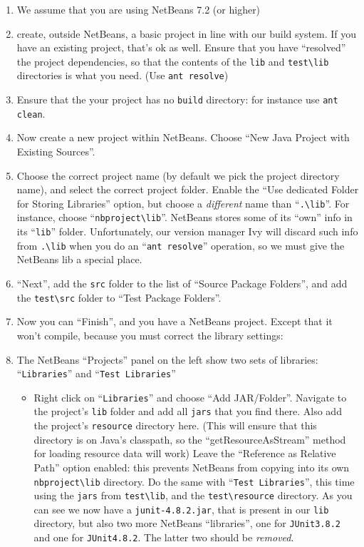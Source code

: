 \begin{enumerate}
\item We assume that you are using NetBeans 7.2 (or higher)
\item create, outside NetBeans, a basic project in line with our build system.
If you have an existing project, that's ok as well.
Ensure that you have ``resolved'' the project dependencies, so that the contents of
the \verb#lib# and \verb#test\lib# directories is what you need.
(Use \verb#ant resolve#)
\item Ensure that the your project has no \verb#build# directory: for instance use \verb#ant clean#.
\item Now create a new project within NetBeans. Choose ``New Java Project with Existing Sources''.
\item Choose the correct project name (by default we pick the project directory name), and select the correct
project folder. Enable the ``Use dedicated Folder for Storing Libraries'' option,
but choose a \emph{different} name than ``\verb#.\lib#''.
For instance, choose ``\verb#nbproject\lib#''.
NetBeans stores some of its ``own'' info in  its ``\verb#lib#'' folder.
 Unfortunately, our version manager Ivy will discard such info from \verb#.\lib# when you
do an ``\verb#ant resolve#'' operation, so we must give the NetBeans lib a special place.
\item ``Next'', add the \verb#src# folder to the list of ``Source Package Folders'',
and add the \verb#test\src# folder to ``Test Package Folders''.
\item Now you can ``Finish'', and you have a NetBeans project.
Except that it won't compile, because you must correct the library settings:
\item The NetBeans ``Projects'' panel on the left show two sets of libraries: ``\verb#Libraries#''
and ``\verb#Test Libraries#''
\begin{itemize}
\item Right click on ``\verb#Libraries#'' and choose ``Add JAR/Folder''. Navigate to the project's
\verb#lib# folder and add all \verb#jars# that you find there.
Also add the project's \verb#resource# directory here. (This will ensure that this directory
is on Java's classpath, so the ``getResourceAsStream'' method for loading resource data will work)
Leave the ``Reference as Relative Path''
option enabled: this prevents NetBeans from copying into its own \verb#nbproject\lib# directory.
Do the same with ``\verb#Test Libraries#'', this time using the \verb#jars# from \verb#test\lib#,
and the \verb#test\resource# directory.
As you can see we now have a \verb#junit-4.8.2.jar#, that is present in our \verb#lib# directory,
but also two more NetBeans ``libraries'', one for \verb#JUnit3.8.2# and one for \verb#JUnit4.8.2#.
The latter two should be \emph{removed}.
\end{itemize}


\end{enumerate}
